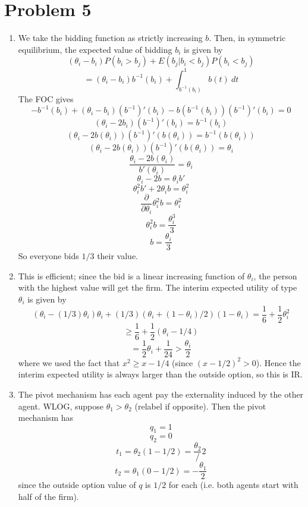 \documentclass[10pt,letter]{article}
\begin{document}
\section*{Problem 5}
\begin{enumerate}[label=(\alph*)]
  \item We take the bidding function as strictly increasing $b$. Then, in symmetric equilibrium, the expected value of bidding $b_i$ is given by
  \[ (\theta_i - b_i)P(b_i > b_j) + E(b_j|b_i < b_j) P(b_i < b_j) \]
  \[ = (\theta_i - b_i)b^{-1}(b_i) + \int_{b^{-1}(b_i)}^1 b(t) \ dt \]
  The FOC gives
  \[ -b^{-1}(b_i) + (\theta_i - b_i)(b^{-1})'(b_i) - b(b^{-1}(b_i)) (b^{-1})'(b_i) = 0 \]
  \[ (\theta_i - 2b_i)(b^{-1})'(b_i)  = b^{-1}(b_i)  \]
  \[ (\theta_i - 2b(\theta_i))(b^{-1})'(b(\theta_i))  = b^{-1}(b(\theta_i))  \]
  \[ (\theta_i - 2b(\theta_i))(b^{-1})'(b(\theta_i))  = \theta_i  \]
  \[ \frac{\theta_i - 2b(\theta_i)}{b'(\theta_i)}  = \theta_i  \]
  \[ \theta_i - 2b = \theta_i b'  \]
  \[ \theta_i^2 b' + 2\theta_i b = \theta_i^2 \]
  \[ \frac{\partial}{\partial \theta_i} \theta_i^2 b = \theta_i^2 \]
  \[ \theta_i^2 b = \frac{\theta_i^3}{3} \]
  \[ b = \frac{\theta_i}{3} \]
  So everyone bids $1/3$ their value.

  \item This is efficient; since the bid is a linear increasing function of $\theta_i$, the person with the highest value will get the firm. The interim expected utility of type $\theta_i$ is given by
  \[ (\theta_i - (1/3)\theta_i)\theta_i + (1/3)(\theta_i + (1-\theta_i)/2)(1-\theta_i) = \frac{1}{6} + \frac{1}{2}\theta_i^2 \]
  \[ \ge \frac{1}{6} + \frac{1}{2}(\theta_i - 1/4) \]
  \[ = \frac{1}{2}\theta_i + \frac{1}{24} > \frac{\theta_i}{2}\]
  where we used the fact that $x^2 \ge x - 1/4$ (since $(x - 1/2)^2 > 0$). Hence the interim expected utility is always larger than the outside option, so this is IR.
  \item The pivot mechanism has each agent pay the externality induced by the other agent. WLOG, suppose $\theta_1 > \theta_2$ (relabel if opposite). Then the pivot mechanism has
  \[ q_1 = 1 \]
  \[ q_2 = 0 \]
  \[ t_1 = \theta_2(1 - 1/2) = \frac{\theta_2}/{2} \]
  \[ t_2 = \theta_1(0 - 1/2) = -\frac{\theta_1}{2} \]
  since the outside option value of $q$ is $1/2$ for each (i.e. both agents start with half of the firm).
\end{enumerate}
\end{document}
